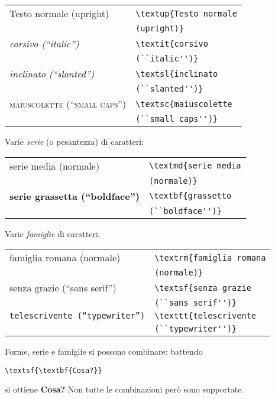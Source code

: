 \begin{center}
\begin{tabular}{ll}
  \textup{Testo normale (upright)} &
    \verb!\textup{Testo normale!\\
    &\qquad\verb!(upright)}!\\ 
  \textit{corsivo (``italic'')} &
    \verb!\textit{corsivo!\\
    &\qquad\verb!(``italic'')}!\\
  \textsl{inclinato (``slanted'')} &
    \verb!\textsl{inclinato!\\
    &\qquad\verb!(``slanted'')}!\\
  \textsc{maiuscolette (``small caps'')} &
    \verb!\textsc{maiuscolette!\\
    &\qquad\verb!(``small caps'')}!
\end{tabular}
\end{center}
%
Varie \emph{serie} (o pesantezza) di caratteri:
%
\begin{center}
\begin{tabular}{ll}
  \textmd{serie media (normale)} &
    \verb!\textmd{serie media!\\
    &\qquad\verb!(normale)}!\\
  \textbf{serie grassetta (``boldface'')} &
    \verb!\textbf{grassetto!\\
    &\qquad\verb!(``boldface'')}!
\end{tabular}
\end{center}
%
Varie \emph{famiglie} di caratteri:
%
\begin{center}
\begin{tabular}{ll}
  \textrm{famiglia romana (normale)} &
    \verb!\textrm{famiglia romana!\\
    &\qquad\verb!(normale)}!\\
  \textsf{senza grazie (``sans serif'')} &
    \verb!\textsf{senza grazie!\\
    &\qquad\verb!(``sans serif'')}!\\
  \texttt{telescrivente (``typewriter'')}&
    \verb!\texttt{telescrivente!\\
    &\qquad\verb!(``typewriter'')}!
\end{tabular}
\end{center}
%
Forme, serie e famiglie si possono combinare: battendo
\begin{center}
  \verb!\textsf{\textbf{Cosa?}}!
\end{center}
si ottiene \textsf{\textbf{Cosa?}} Non tutte le
combinazioni per\`o sono supportate.

